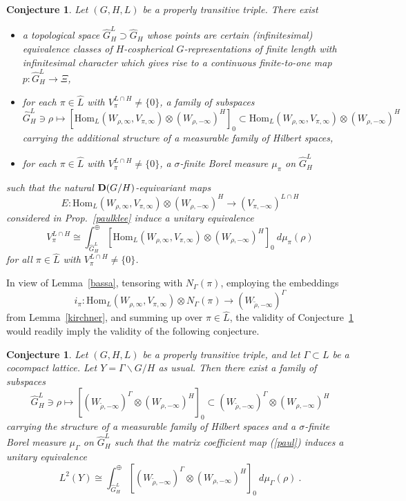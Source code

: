 \documentclass[10]{amsart}
\newtheorem{con}[thm]{Conjecture}
\theoremstyle{remark}
\theoremstyle{definition}
\numberwithin{equation}{section}
\newcommand{\Hom}{\mathrm{Hom}}
\newcommand{\be}{\begin{equation}}
\begin{document}
{\begin{con}\label{C1}
Let $(G,H,L)$ be a properly transitive triple. There exist
\begin{itemize} 
\item a topological space $\widehat G_H^L\supset \widehat G_H$ whose points are certain (infinitesimal) equivalence classes of $H$-cospherical $G$-representations of finite
length with infinitesimal character which gives rise to a continuous finite-to-one map $p: \widehat G_H^L\rightarrow \Xi$,
\item for each $\pi\in\widehat L$ with $V_\pi^{L\cap H}\ne\{0\}$, a family of subspaces 
$$\widehat G_H^L\ni\rho\mapsto\left [\Hom_L(W_{\rho,\infty},V_{\pi,\infty})\otimes (W_{\rho,-\infty})^H\right ]_0\subset \Hom_L(W_{\rho,\infty},V_{\pi,\infty})\otimes (W_{\rho,-\infty})^H$$ 
carrying the additional structure of a measurable family of Hilbert spaces,
\item for each $\pi\in\widehat L$ with $V_\pi^{L\cap H}\ne\{0\}$, a $\sigma$-finite Borel measure $\mu_\pi$ on $\widehat G_H^L$
\end{itemize}
such that the natural ${\bf D}(G/H)$-equivariant maps 
$$   E: \Hom_L(W_{\rho,\infty},V_{\pi,\infty})\otimes (W_{\rho,-\infty})^H\longrightarrow  (V_{\pi,-\infty})^{L\cap H}$$
considered in Prop.~\ref{paulklee} induce a unitary equivalence
\be\label{D1}   V_\pi^{L\cap H} \cong \int^\oplus_{\widehat G_H^L}\left [\Hom_L(W_{\rho,\infty},V_{\pi,\infty})\otimes (W_{\rho,-\infty})^H\right ]_0\:d\mu_\pi(\rho)
\end{equation}
for all $\pi\in\widehat L$ with $V_\pi^{L\cap H}\ne\{0\}$.
\end{con}

In view of Lemma~\ref{bassa}, tensoring with $N_\Gamma(\pi)$, employing the embeddings 
$$i_\pi : \Hom_L(W_{\rho,\infty}, V_{\pi,\infty})\otimes N_\Gamma(\pi)\rightarrow (W_{\tilde \rho,-\infty})^\Gamma$$
from Lemma~\ref{kirchner}, and summing up over $\pi\in\widehat L$, the validity of Conjecture~\ref{C1} would readily imply the validity of the
following conjecture.

\begin{con}\label{C2}
Let $(G,H,L)$ be a properly transitive triple, and let $\Gamma\subset L$ be  a cocompact lattice. Let $Y=\Gamma\backslash G/H$ as usual.
Then there exist a family of subspaces
$$ \widehat G_H^L\ni\rho\mapsto\left [(W_{\tilde \rho,-\infty})^\Gamma\otimes  (W_{\rho,-\infty})^H\right ]_0\subset (W_{\tilde \rho,-\infty})^\Gamma\otimes  (W_{\rho,-\infty})^H$$
carrying the structure of a measurable family of Hilbert spaces 
and a $\sigma$-finite Borel measure $\mu_\Gamma$ on $\widehat G_H^L$
such that the matrix coefficient map (\ref{paul}) induces a unitary equivalence
\be\label{D2}  L^2(Y) \cong \int^\oplus_{\widehat G_H^L} \left [(W_{\tilde \rho,-\infty})^\Gamma\otimes  (W_{\rho,-\infty})^H\right ]_0\:d\mu_\Gamma(\rho)\ .
\end{equation}
\end{con}

}
\end{document}
